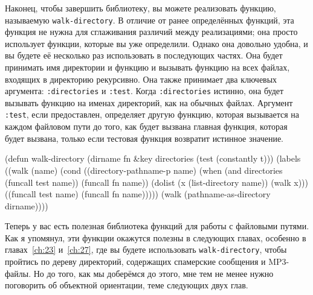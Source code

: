 Наконец, чтобы завершить библиотеку, вы можете реализовать функцию, называемую
\lstinline{walk-directory}. В отличие от ранее определённых функций, эта функция не нужна для
сглаживания различий между реализациями; она просто использует функции, которые вы уже
определили. Однако она довольно удобна, и вы будете её несколько раз использовать в
последующих частях. Она будет принимать имя директории и функцию и вызывать функцию на
всех файлах, входящих в директорию рекурсивно. Она также принимает два ключевых аргумента:
\lstinline{:directories} и \lstinline{:test}. Когда \lstinline{:directories} истинно, она будет вызывать
функцию на именах директорий, как на обычных файлах. Аргумент \lstinline{:test}, если
предоставлен, определяет другую функцию, которая вызывается на каждом файловом пути до
того, как будет вызвана главная функция, которая будет вызвана, только если тестовая
функция возвратит истинное значение.

\begin{myverb}
(defun walk-directory (dirname fn &key directories (test (constantly t)))
  (labels
      ((walk (name)
         (cond
           ((directory-pathname-p name)
            (when (and directories (funcall test name))
              (funcall fn name))
            (dolist (x (list-directory name)) (walk x)))
           ((funcall test name) (funcall fn name)))))
    (walk (pathname-as-directory dirname))))
\end{myverb}

Теперь у вас есть полезная библиотека функций для работы с файловыми путями. Как я
упомянул, эти функции окажутся полезны в следующих главах, особенно в главах~\ref{ch:23}
и~\ref{ch:27}, где вы будете использовать \lstinline{walk-directory}, чтобы пройтись по
дереву директорий, содержащих спамерские сообщения и MP3-файлы. Но до того, как мы
доберёмся до этого, мне тем не менее нужно поговорить об объектной ориентации, теме
следующих двух глав.

